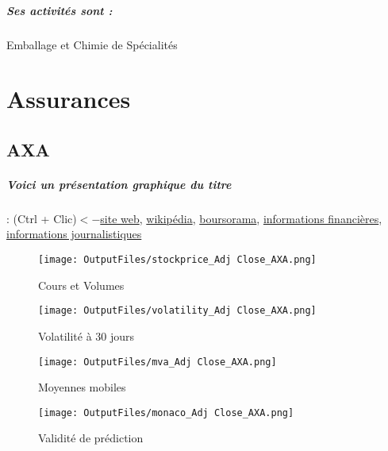 \documentclass[11pt,a4paper]{report}%
\begin{document}
\paragraph{Ses activités sont : } Emballage et Chimie de Spécialités 
    
    \newpage\chapter{Assurances}


\section{AXA}

\paragraph{Voici un présentation graphique du titre} : (Ctrl + Clic)$<-$\href{https://www.axa.com/fr/investisseurs/presentations-des-resultats}{site web}, \href{https://fr.wikipedia.org/wiki/Axa}{wikipédia}, \href{https://www.boursorama.com/cours/1rPCS}{boursorama}, \href{https://www.qwant.com/?q=site:https:%2f%2fwww.easybourse.com%2faction-societe%2fAXA&t=web&client=ext-firefox-hp}{informations financières}, \href{https://bourse.lerevenu.com/cours-de-bourse/fiche-valeur-synthese/AXA/CS-FR}{informations journalistiques}
\begin{figure}[!htb]
   \begin{minipage}{0.5\textwidth}
     \centering
     \texttt{[image: OutputFiles/stockprice\_Adj Close\_AXA.png]}
     \caption{Cours et Volumes}\label{Fig:price_AXA}
   \end{minipage}\hfill
   \begin{minipage}{0.5\textwidth}
     \centering
     \texttt{[image: OutputFiles/volatility\_Adj Close\_AXA.png]}
     \caption{Volatilité à 30 jours}\label{Fig:volat_AXA}
   \end{minipage}
\end{figure}
\begin{figure}[!htb]
   \begin{minipage}{0.5\textwidth}
     \centering
     \texttt{[image: OutputFiles/mva\_Adj Close\_AXA.png]}
     \caption{Moyennes mobiles}\label{Fig:mva_AXA}
   \end{minipage}\hfill
   \begin{minipage}{0.5\textwidth}
     \centering
     \texttt{[image: OutputFiles/monaco\_Adj Close\_AXA.png]}
     \caption{Validité de prédiction}\label{Fig:prediction_AXA}
   \end{minipage}
\end{figure}
\end{document}
